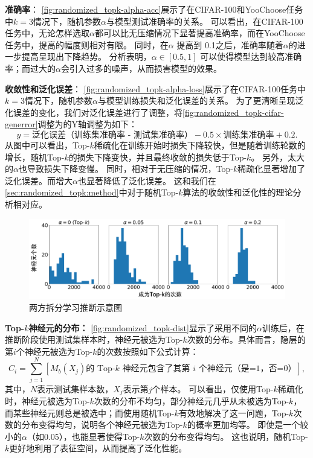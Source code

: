 \textbf{准确率}：
\autoref{fig:randomized_topk-alpha-acc}展示了在CIFAR-100和YooChoose任务中$k=3$情况下，随机参数$\alpha$与模型测试准确率的关系。
可以看出，在CIFAR-100任务中，无论怎样选取$\alpha$都可以比无压缩情况下显著提高准确率，而在YooChoose任务中，提高的幅度则相对有限。
同时，在$\alpha$ 提高到 0.1之后，准确率随着$\alpha$的进一步提高呈现出下降趋势。
%
分析表明，$\alpha \in [0.5, 1]$ 可以使得模型达到较高准确率；而过大的$\alpha$会引入过多的噪声，从而损害模型的效果。


\textbf{收敛性和泛化误差}：
\autoref{fig:randomized_topk-alpha-loss}展示了在CIFAR-100任务中$k=3$情况下，随机参数$\alpha$与模型训练损失和泛化误差的关系。
为了更清晰呈现泛化误差的变化，我们对泛化误差进行了调整，将\autoref{fig:randomized_topk-cifar-generror}调整为的Y轴调整为如下：
\begin{equation}
    y = \text{泛化误差（训练集准确率 - 测试集准确率）} - 0.5 \times \text{训练集准确率} + 0.2.
\end{equation}
%
从图中可以看出，Top-$k$稀疏化在训练开始时损失下降较快，但是随着训练轮数的增长，随机Top-$k$的损失下降变快，并且最终收敛的损失低于Top-$k$。
另外，太大的$\alpha$也导致损失下降变慢。
%
同时，相对于无压缩的情况，Top-$k$稀疏化显著增加了泛化误差。而增大$\alpha$也显著降低了泛化误差。
%
这和我们在\autoref{sec:randomized_topk:method}中对于随机Top-$k$算法的收敛性和泛化性的理论分析相对应。



\begin{figure}[h!]
    \centering
    \includegraphics[width=\linewidth]{Z_Resources/随机topk_cifar100-dist-topk.pdf}
    \caption{两方拆分学习推断示意图}
    \label{fig:randomized_topk-dist}
\end{figure}

\textbf{Top-$k$神经元的分布：}
\autoref{fig:randomized_topk-dist}显示了采用不同的$\alpha$训练后，在推断阶段使用测试集样本时，神经元被选为Top-$k$次数的分布。具体而言，隐层的第$i$个神经元被选为Top-$k$的次数按照如下公式计算：
\begin{equation}
    C_i = \sum_{j=1}^N [\text{$M_b(X_j)$的 Top-$k$ 神经元包含了其第 $i$ 个神经元（是=1，否=0）}],
\end{equation}
其中，$N$表示测试集样本数，$X_j$表示第$j$个样本。
%
%
可以看出，仅使用Top-$k$稀疏化时，神经元被选为Top-$k$次数的分布不均匀，部分神经元几乎从未被选为Top-$k$，而某些神经元则总是被选中；而使用随机Top-$k$有效地解决了这一问题，Top-$k$次数的分布变得均匀，说明各个神经元被选为Top-$k$的概率更加均等。
%
即使是一个较小的$\alpha$（如0.05），也能显著使得Top-$k$次数的分布变得均匀。
%
这也说明，随机Top-$k$更好地利用了表征空间，从而提高了泛化性能。
%


